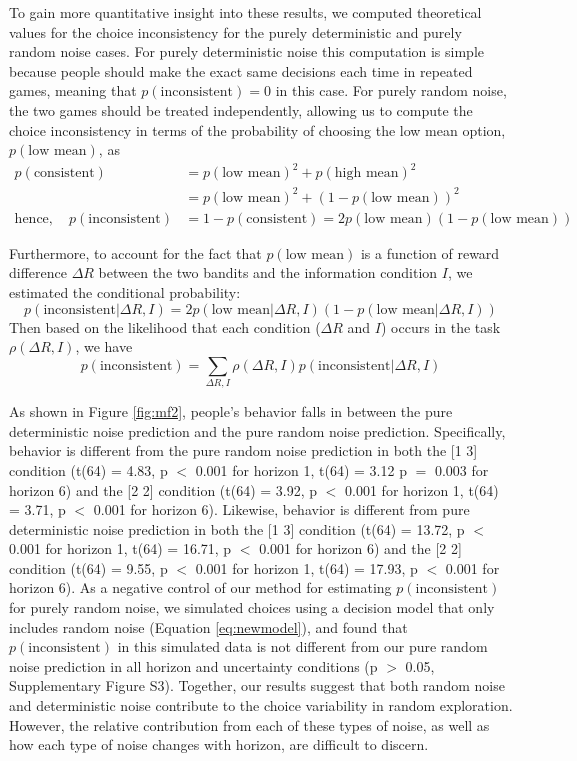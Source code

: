 \documentclass[12pt]{article}
\begin{document}
{To gain more quantitative insight into these results, we computed theoretical values for the choice inconsistency for the purely deterministic and purely random noise cases.  For purely deterministic noise this computation is simple because people should make the exact same decisions each time in repeated games, meaning that $p(\mbox{inconsistent}) = 0$ in this case. For purely random noise, the two games should be treated independently, allowing us to compute the choice inconsistency in terms of the probability of choosing the low mean option, $p(\mbox{low mean})$, as
\begin{equation*}
	\begin{split}
		p(\mbox{consistent}) &= p(\mbox{low mean})^2 + p(\mbox{high mean})^2\\
		&= p(\mbox{low mean})^2 + (1-p(\mbox{low mean}))^2\\ 
		\mbox{hence},\quad p(\mbox{inconsistent}) &=  
		1 - p(\mbox{consistent}) = 
		2 p(\mbox{low mean})(1-p(\mbox{low mean}))
	\end{split}
\end{equation*}

Furthermore, to account for the fact that $p(\mbox{low mean})$ is a function of reward difference $\Delta R$ between the two bandits and the information condition $I$, we estimated the conditional probability:
	$$p(\mbox{inconsistent}|\Delta R, I) = 2 p(\mbox{low mean}|\Delta R, I)(1-p(\mbox{low mean}|\Delta R, I))$$
	Then based on the likelihood that each condition ($\Delta R$ and $I$) occurs in the task $\rho(\Delta R, I)$, we have
	$$p(\mbox{inconsistent}) = \sum_{\Delta R, I}\rho(\Delta R, I)p(\mbox{inconsistent}|\Delta R, I)$$

As shown in Figure \ref{fig:mf2}, people's behavior falls in between the pure deterministic noise prediction and the pure random noise prediction. Specifically, behavior is different from the pure random noise prediction in both the [1 3] condition (t(64) = 4.83, p $<$ 0.001 for horizon 1, t(64) = 3.12 p $=$ 0.003 for horizon 6) and the [2 2] condition (t(64) = 3.92, p $<$ 0.001 for horizon 1, t(64) = 3.71, p $<$ 0.001 for horizon 6). Likewise, behavior is different from pure deterministic noise prediction in both the [1 3] condition (t(64) = 13.72, p $<$ 0.001 for horizon 1, t(64) = 16.71, p $<$ 0.001 for horizon 6) and the [2 2] condition (t(64) = 9.55, p $<$ 0.001 for horizon 1, t(64) = 17.93, p $<$ 0.001 for horizon 6). As a negative control of our method for estimating $p(\mbox{inconsistent})$ for purely random noise, we simulated choices using a decision model that only includes random noise (Equation \ref{eq:newmodel}), and found that $p(\mbox{inconsistent})$ in this simulated data is not different from our pure random noise prediction in all horizon and uncertainty conditions (p $>$ 0.05, Supplementary Figure S3). Together, our results suggest that both random noise and deterministic noise contribute to the choice variability in random exploration. However, the relative contribution from each of these types of noise, as well as how each type of noise changes with horizon, are difficult to discern.

}
\end{document}
